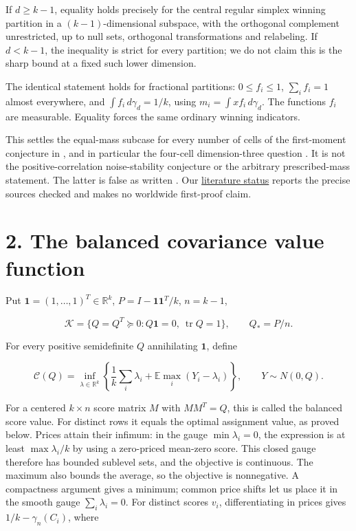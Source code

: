 \documentclass[11pt]{article}
\begin{document}
If \(d\ge k-1\), equality holds precisely for the central regular
simplex winning partition in a \((k-1)\)-dimensional subspace, with the
orthogonal complement unrestricted, up to null sets, orthogonal
transformations and relabeling. If \(d<k-1\), the inequality is strict
for every partition; we do not claim this is the sharp bound at a fixed
such lower dimension.

The identical statement holds for fractional partitions:
\(0\le f_i\le1\), \(\sum_i f_i=1\) almost everywhere, and
\(\int f_i\,d\gamma_d=1/k\), using \(m_i=\int xf_i\,d\gamma_d\). The
functions \(f_i\) are measurable. Equality forces the same ordinary
winning indicators.

This settles the equal-mass subcase for every number of cells of the
first-moment conjecture in \cite[Problem 1.15 and Conjecture 1.16]{H19},
and in particular the four-cell dimension-three question
\cite[Conjecture 3]{H14}. It is not the positive-correlation
noise-stability conjecture or the arbitrary prescribed-mass statement.
The latter is false as written \cite{EX}. Our
\href{https://github.com/mxym/math/blob/dd15765aa0854388251b552a31df9e750bd36bb0/research/gaussian-balanced-simplex-all-k/LITERATURE_STATUS.md}{literature
status} reports the precise sources checked and makes no worldwide
first-proof claim.

\section{2. The balanced covariance value
function}\label{the-balanced-covariance-value-function}

Put \(\mathbf1=(1,\ldots,1)^T\in\mathbb R^k\),
\(P=I-\mathbf1\mathbf1^T/k\), \(n=k-1\),

\[
 \mathcal K=\{Q=Q^T\succeq0:Q\mathbf1=0,\ \operatorname{tr}Q=1\},
 \qquad Q_*=P/n.
\]

For every positive semidefinite \(Q\) annihilating \(\mathbf1\), define

\[
 \mathcal C(Q)=\inf_{\lambda\in\mathbb R^k}
 \left\{\frac1k\sum_i\lambda_i+
               \mathbb E\max_i(Y_i-\lambda_i)\right\},
 \qquad Y\sim N(0,Q).                                      \tag{3}
\]

For a centered \(k\times n\) score matrix \(M\) with \(MM^T=Q\), this is
called the balanced score value. For distinct rows it equals the optimal
assignment value, as proved below. Prices attain their infimum: in the
gauge \(\min\lambda_i=0\), the expression is at least
\(\max\lambda_i/k\) by using a zero-priced mean-zero score. This closed
gauge therefore has bounded sublevel sets, and the objective is
continuous. The maximum also bounds the average, so the objective is
nonnegative. A compactness argument gives a minimum; common price shifts
let us place it in the smooth gauge \(\sum_i\lambda_i=0\). For distinct
scores \(v_i\), differentiating in prices gives \(1/k-\gamma_n(C_i)\),
where
\end{document}
